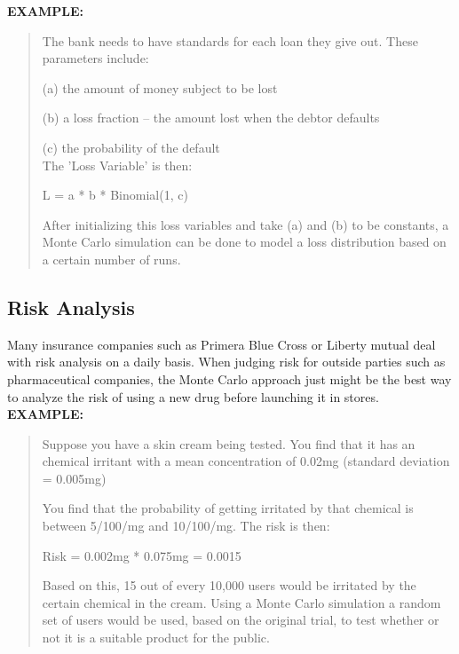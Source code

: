 \documentclass{article}
\begin{document}
\textbf{EXAMPLE:}

\begin{quote}
The bank needs to have standards for each loan they give out. These parameters include:

\hspace{4ex}(a) the amount of money subject to be lost

\hspace{4ex}(b) a loss fraction -- the amount lost when the debtor defaults

\hspace{4ex}(c) the probability of the default \\

The 'Loss Variable' is then:

\centerline{L = a * b * Binomial(1, c)}

After initializing this loss variables and take (a) and (b) to be constants, a Monte Carlo simulation can be done to model a loss distribution based on a certain number of runs.
\end{quote}

\subsection{Risk Analysis}
\hspace{4ex} Many insurance companies such as Primera Blue Cross or Liberty mutual deal with risk analysis on a daily basis. When judging risk for outside parties such as pharmaceutical companies, the Monte Carlo approach just might be the best way to analyze the risk of using a new drug before launching it in stores. \\

\textbf{EXAMPLE:}

\begin{quote}
Suppose you have a skin cream being tested. You find that it has an chemical irritant with a mean concentration of 0.02mg (standard deviation = 0.005mg)

You find that the probability of getting irritated by that chemical is between 5/100/mg and 10/100/mg. The risk is then: \\

\centerline{Risk = 0.002mg * 0.075mg = 0.0015}

Based on this, 15 out of every 10,000 users would be irritated by the certain chemical in the cream. Using a Monte Carlo simulation a random set of users would be used, based on the original trial, to test whether or not it is a suitable product for the public.
\end{quote}
\end{document}
